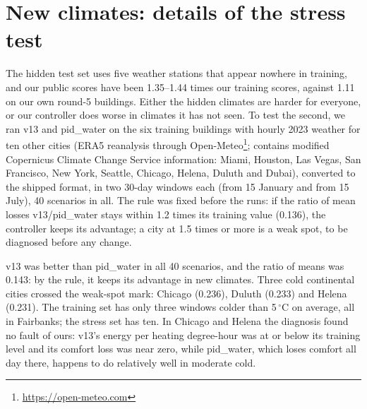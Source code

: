 \documentclass{article}
\begin{document}
\section{New climates: details of the stress test}\label{app:stress}
The hidden test set uses five weather stations that appear nowhere in training, and our public scores have been
1.35--1.44 times our training scores, against 1.11 on our own round-5 buildings. Either the hidden climates are harder
for everyone, or our controller does worse in climates it has not seen. To test the second, we ran v13 and pid\_water
on the six training buildings with hourly 2023 weather for ten other cities (ERA5 reanalysis \cite{hersbach2020era5} through
Open-Meteo\footnote{\url{https://open-meteo.com}}; contains modified Copernicus Climate Change Service information: Miami, Houston, Las Vegas, San Francisco, New York, Seattle,
Chicago, Helena, Duluth and Dubai), converted to the shipped format, in two 30-day windows each (from 15 January and
from 15 July), 40 scenarios in all. The rule was fixed before the runs: if the ratio of mean losses v13/pid\_water
stays within 1.2 times its training value (0.136), the controller keeps its advantage; a city at 1.5 times or more is
a weak spot, to be diagnosed before any change.

v13 was better than pid\_water in all 40 scenarios, and the ratio of means was 0.143: by the rule, it keeps its
advantage in new climates. Three cold continental cities crossed the weak-spot mark: Chicago (0.236), Duluth (0.233)
and Helena (0.231). The training set has only three windows colder than 5\,$^\circ$C on average, all in Fairbanks;
the stress set has ten. In Chicago and Helena the diagnosis found no fault of ours: v13's energy per heating
degree-hour was at or below its training level and its comfort loss was near zero, while pid\_water, which loses
comfort all day there, happens to do relatively well in moderate cold.
\end{document}
